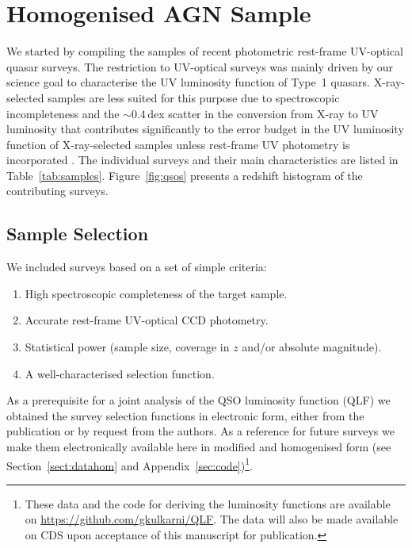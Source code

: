\documentclass[fleqn,usenatbib]{mnras}
\begin{document}
\section{Homogenised AGN Sample}
\label{sec:sample}

We started by compiling the samples of recent photometric rest-frame
UV-optical quasar surveys. The restriction to UV-optical surveys was
mainly driven by our science goal to characterise the UV luminosity
function of Type~1 quasars. X-ray-selected samples are less suited for
this purpose due to spectroscopic incompleteness and the $\sim
0.4$\,dex scatter in the conversion from X-ray to UV luminosity
\citep{2010A&A...512A..34L, 2015MNRAS.453.1946G, 2016ApJ...819..154L}
that contributes significantly to the error budget in the UV
luminosity function of X-ray-selected samples unless rest-frame UV
photometry is incorporated \citep{2015AA...578A..83G}.  The individual
surveys and their main characteristics are listed in
Table~\ref{tab:samples}.  Figure~\ref{fig:qsos} presents a redshift
histogram of the contributing surveys.

\subsection{Sample Selection}
\label{sect:samplesel}

We included surveys based on a set of simple criteria:
\begin{enumerate}
\item High spectroscopic completeness of the target sample.
\item Accurate rest-frame UV-optical CCD photometry.
\item Statistical power (sample size, coverage in $z$ and/or absolute magnitude).
\item A well-characterised selection function.
\end{enumerate}
As a prerequisite for a joint analysis of the QSO luminosity function
(QLF) we obtained the survey selection functions in electronic form,
either from the publication or by request from the authors. As a
reference for future surveys we make them electronically available
here in modified and homogenised form (see Section~\ref{sect:datahom}
and Appendix~\ref{sec:code})\footnote{These data and the code for
  deriving the luminosity functions are available on
  \url{https://github.com/gkulkarni/QLF}.  The data will also be made
  available on CDS upon acceptance of this manuscript for
  publication.}.
\end{document}
